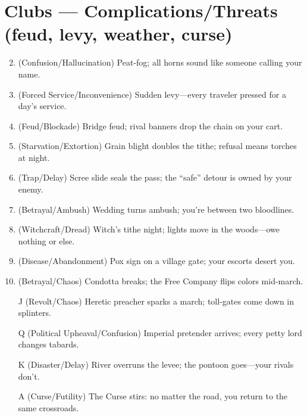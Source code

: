 \section*{Clubs --- Complications/Threats (feud, levy, weather, curse)}
\label{sec:acasia-complications}
\begin{enumerate}
\setcounter{enumi}{1}
\item (Confusion/Hallucination) Peat-fog; all horns sound like someone calling your name.
\item (Forced Service/Inconvenience) Sudden levy---every traveler pressed for a day's service.
\item (Feud/Blockade) Bridge feud; rival banners drop the chain on your cart.
\item (Starvation/Extortion) Grain blight doubles the tithe; refusal means torches at night.
\item (Trap/Delay) Scree slide seals the pass; the ``safe'' detour is owned by your enemy.
\item (Betrayal/Ambush) Wedding turns ambush; you're between two bloodlines.
\item (Witchcraft/Dread) Witch's tithe night; lights move in the woods---owe nothing or else.
\item (Disease/Abandonment) Pox sign on a village gate; your escorts desert you.
\item (Betrayal/Chaos) Condotta breaks; the Free Company flips colors mid-march.
\item[J] (Revolt/Chaos) Heretic preacher sparks a march; toll-gates come down in splinters.
\item[Q] (Political Upheaval/Confusion) Imperial pretender arrives; every petty lord changes tabards.
\item[K] (Disaster/Delay) River overruns the levee; the pontoon goes---your rivals don't.
\item[A] (Curse/Futility) The Curse stirs: no matter the road, you return to the same crossroads.
\end{enumerate}

